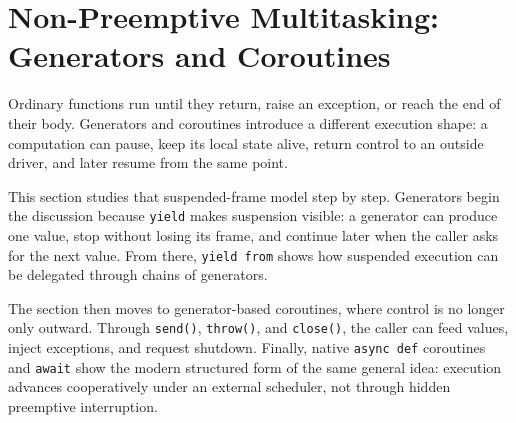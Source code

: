 \section{Non-Preemptive Multitasking: Generators and Coroutines}

Ordinary functions run until they return, raise an exception, or reach the end of their body. Generators and coroutines introduce a different execution shape: a computation can pause, keep its local state alive, return control to an outside driver, and later resume from the same point.

This section studies that suspended-frame model step by step. Generators begin the discussion because \texttt{yield} makes suspension visible: a generator can produce one value, stop without losing its frame, and continue later when the caller asks for the next value. From there, \texttt{yield from} shows how suspended execution can be delegated through chains of generators.

The section then moves to generator-based coroutines, where control is no longer only outward. Through \texttt{send()}, \texttt{throw()}, and \texttt{close()}, the caller can feed values, inject exceptions, and request shutdown. Finally, native \texttt{async def} coroutines and \texttt{await} show the modern structured form of the same general idea: execution advances cooperatively under an external scheduler, not through hidden preemptive interruption.